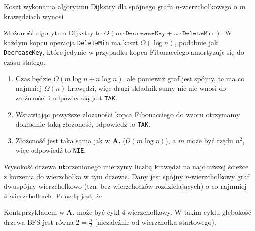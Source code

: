 \begin{solutions}
    \sol Koszt wykonania algorytmu Dijkstry dla spójnego grafu $n$-wierzchołkowego o $m$ krawędziach wynosi

     Złożoność algorytmu Dijkstry to $O(m\cdot\texttt{DecreaseKey}+n\cdot\texttt{DeleteMin})$. W każdym kopcu operacja \texttt{DeleteMin} ma koszt $O(\log{n})$, podobnie jak \texttt{DecreaseKey}, które jedynie w przypadku kopca Fibonacciego amortyzuje się do czasu stałego.

    \begin{enumerate}[\bf A.]
        \item Czas będzie $O(m\log{n}+n\log{n})$, ale ponieważ graf jest spójny, to ma co najmniej $\Omega(n)$ krawędzi, więc drugi składnik sumy nic nie wnosi do złożoności i odpowiedzią jest \texttt{TAK}.

        \item Wstawiając powyższe złożoności kopca Fibonacciego do wzoru otrzymamy dokładnie taką złożoność, odpowiedź to \texttt{TAK}.

        \item Złożoność jest taka sama jak w \textbf{A.} ($O(m \log n)$), a $m$ może być rzędu $n^2$, więc odpowiedź to \texttt{NIE}.
    \end{enumerate}

    \sol Wysokość drzewa ukorzenionego mierzymy liczbą krawędzi na najdłuższej ścieżce z korzenia do wierzchołka w tym drzewie. Dany jest spójny $n$-wierzchołkowy graf dwuspójny wierzchołkowo (tzn. bez wierzchołków rozdzielających) o co najmniej 4 wierzchołkach. Prawdą jest, że
    
    Kontrprzykładem w \textbf{A.} może być cykl 4-wierzchołkowy. W takim cyklu głębokość drzewa BFS jest równa $2 = \frac{n}{2}$ (niezależnie od wierzchołka startowego).
    

\end{solutions}
